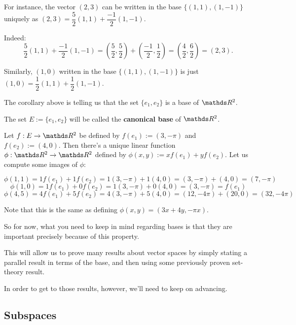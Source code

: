 \begin{ex}
	For instance, the vector $(2,3)$ can be written in the base $\{(1,1),(1,-1)\}$ uniquely as $(2,3)=\dfrac{5}{2}(1,1)+\dfrac{-1}{2}(1,-1)$.
	
	Indeed:
	\[\dfrac{5}{2}(1,1)+\dfrac{-1}{2}(1,-1)=\left(\dfrac{5}{2},\dfrac{5}{2}\right)+\left(\dfrac{-1}{2},\dfrac{1}{2}\right)=\left(\dfrac{4}{2},\dfrac{6}{2}\right)=(2,3).\]
	
	Similarly, $(1,0)$ written in the base $\{(1,1),(1,-1)\}$ is just $(1,0)=\dfrac{1}{2}(1,1)+\dfrac{1}{2}(1,-1)$.
\end{ex}

The corollary above is telling us that the set $\{e_1,e_2\}$ is a base of $\R^2$.

\begin{df}
	The set $E:=\{e_1,e_2\}$ will be called the \textbf{canonical base} of $\R^2$.
\end{df}

\begin{ex}
	Let $f:E\to\R^2$ be defined by $f(e_1):=(3,-\pi)$ and $f(e_2):=(4,0)$. Then there's a unique linear function $\phi:\R^2\to\R^2$ defined by $\phi(x,y):=xf(e_1)+yf(e_2)$. Let us compute some images of $\phi$:
	
	$$\phi(1,1)=1f(e_1)+1f(e_2)=1(3,-\pi)+1(4,0)=(3,-\pi)+(4,0)=(7,-\pi)$$
	$$\phi(1,0)=1f(e_1)+0f(e_2)=1(3,-\pi)+0(4,0)=(3,-\pi)=f(e_1)$$
	$$\phi(4,5)=4f(e_1)+5f(e_2)=4(3,-\pi)+5(4,0)=(12,-4\pi)+(20,0)=(32,-4\pi)$$
	
	Note that this is the same as defining $\phi(x,y)=(3x+4y,-\pi x)$.
\end{ex}

So for now, what you need to keep in mind regarding bases is that they are important precisely because of this property.

This will allow us to prove many results about vector spaces by simply stating a parallel result in terms of the base, and then using some previously proven set-theory result.

In order to get to those results, however, we'll need to keep on advancing.

\newpage
\subsection{Subspaces}

